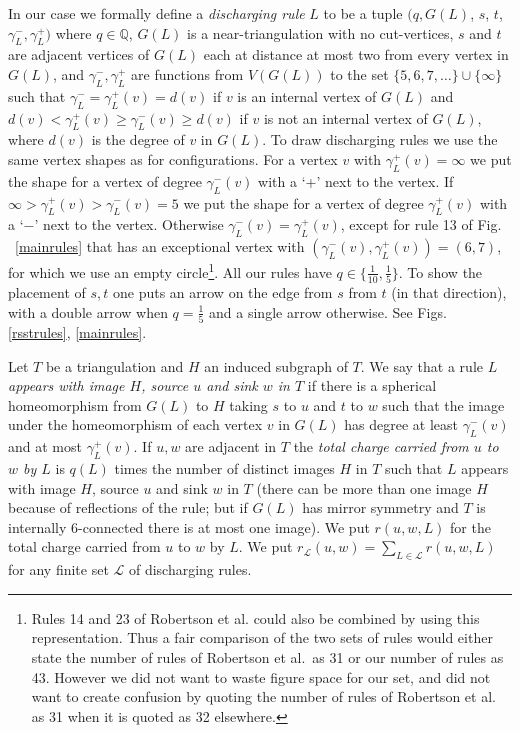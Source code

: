 \documentclass[11pt]{article}
\newcommand{\qq}{\mathbb{Q}}
\newcommand{\mcal}{\mathcal}
\newcommand{\gm}{\gamma}
\begin{document}
In our case we formally define a 
\emph{discharging rule} $L$ to be a tuple $(q, G(L)$, $s$, $t$, $\gm_L^-, \gm_L^+)$ where $q \in \qq$, $G(L)$ is a near-triangulation with no cut-vertices, $s$ and $t$ are adjacent vertices of $G(L)$ each at distance at most two from every vertex in $G(L)$, and 
$\gm_L^-, \gm_L^+$ are functions from $V(G(L))$ to the set $\{ 5, 6, 7, \ldots \} \cup \{\infty \}$ such that $\gm_L^- = \gm_L^+(v) = d(v)$ if $v$ is an internal vertex of $G(L)$ and $d(v) < \gm_L^+(v) \geq \gm_L^-(v) \geq d(v)$ if $v$ is not an internal vertex of $G(L)$, where $d(v)$ is the degree of $v$ in $G(L)$. To draw discharging rules we use the same vertex shapes as for configurations. For a vertex $v$ with $\gm_L^+(v) = \infty$ we put the shape for a vertex of degree $\gm_L^-(v)$ with a `+' next to the vertex. If $\infty > \gm_L^+(v) > \gm_L^-(v) = 5$ we put the shape for a vertex of degree $\gm_L^+(v)$ with a `$-$' next to the vertex. Otherwise $\gm_L^-(v) = \gm_L^+(v)$, except for 
rule 13 of Fig$.$~\ref{mainrules} that has an exceptional vertex with $(\gm_L^-(v), \gm_L^+(v)) = (6, 7)$, for which we use an empty circle\footnote{Rules 14 and 23 of Robertson et al. could also be combined by using this representation. Thus a fair comparison of the two sets of rules would either state the number of rules of Robertson et al.~as 31 or our number of rules as 43. However we did not want to waste figure space for our set, and did not want to create confusion by quoting the number of rules of Robertson et al. as 31 when it is quoted as 32 elsewhere.}. All our rules have $q \in \{\frac{1}{10}, \frac{1}{5} \}$. To show the placement of $s, t$ one puts an arrow on the edge from $s$ from $t$ (in that direction), with a double arrow when $q = \frac{1}{5}$ and a single arrow otherwise. See Figs$.$ \ref{rsstrules}, \ref{mainrules}.

Let $T$ be a triangulation and $H$ an induced subgraph of $T$. We say that a rule $L$ \emph{appears with image $H$, source $u$ and sink $w$ in $T$} if there is a spherical homeomorphism from $G(L)$ to $H$ taking $s$ to $u$ and $t$ to $w$ such that the image under the homeomorphism of each vertex $v$ in $G(L)$ has degree at least $\gm_L^-(v)$ and at most $\gm_L^+(v)$. 
If $u, w$ are adjacent in $T$ the \emph{total charge carried from $u$ to $w$ by $L$} is $q(L)$ times the number of distinct images $H$ in $T$ such that $L$ appears with image $H$, source $u$ and sink $w$ in $T$ (there can be more than one image $H$ because of reflections of the rule; but if $G(L)$ has mirror symmetry and $T$ is internally 6-connected there is at most one image). We put $r(u,w,L)$ for the total charge carried from $u$ to $w$ by $L$. 
We put $r_\mcal{L}(u,w) = \sum_{L \in \mcal{L}}r(u,w,L)$ for any finite set $\mcal{L}$ of discharging rules.
\end{document}
